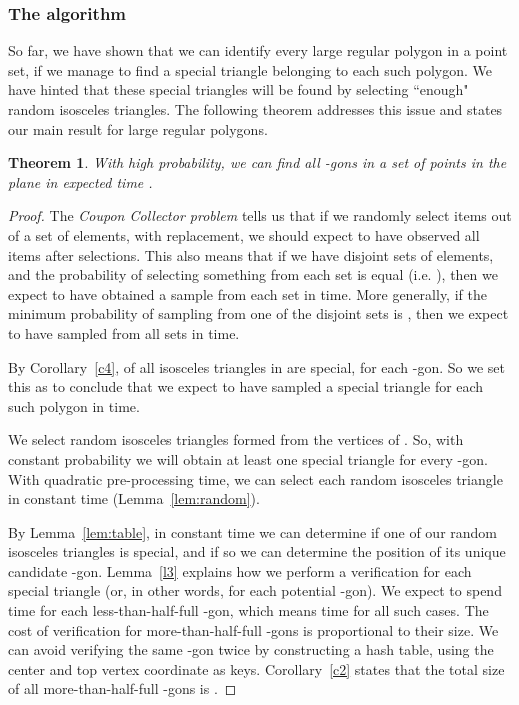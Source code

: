 \documentclass{article}
\newtheorem{theorem}{Theorem}
\begin{document}
\subsubsection{The algorithm}
\label{alltogether}
So far, we have shown that we can identify every large regular polygon in a point set, if
we manage to find a special triangle belonging to each such polygon.
We have hinted that these special triangles will be found by selecting ``enough" random isosceles triangles.
The following theorem addresses this issue and states our main result for large regular polygons.

\begin{theorem}
\label{big-gons}
With high probability, we can find all  -gons in a set  of  points in the 
plane in expected time .
\end{theorem}

\begin{proof}
The {\em Coupon Collector problem} tells us that if we randomly select items out of a set of  elements, with replacement, we should expect to have observed all  items after  selections.    This also means that if we have  disjoint sets of elements, and the probability of selecting something from each set is
equal (i.e. ), then we expect to have obtained a sample from each set in  time.
More generally,  if the minimum probability of sampling from one of the disjoint sets is
, then we expect to have sampled from all sets in  time.

By Corollary~\ref{c4},    of all isosceles triangles in  are
special, for each -gon.
So we set this as  to conclude that we expect to have sampled a special triangle for each
such polygon in  time.

We select  random
isosceles triangles formed from the vertices of . 
So, with  constant probability we will obtain at least one special triangle for every -gon. 
With quadratic pre-processing time,
we can select each random isosceles triangle in constant time (Lemma~\ref{lem:random}).

By Lemma~\ref{lem:table}, in constant time we can determine if one of our random isosceles triangles is
special, and if so we can determine the position of its unique candidate -gon.
Lemma~\ref{l3} explains how we perform a verification for each special triangle (or, in other words,
for each potential -gon).
We expect to spend  time  for each less-than-half-full -gon, which means
 time for all such cases. 
The cost of verification for more-than-half-full -gons is proportional to their size.
We can avoid verifying the same -gon twice by constructing a hash table, using the center
and top vertex coordinate as keys.
Corollary~\ref{c2} states that the total size of all
more-than-half-full -gons is . 
\end{proof}
\end{document}
